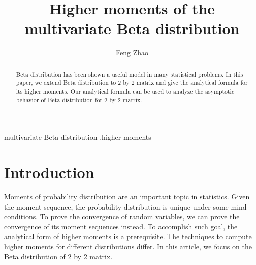\documentclass{elsarticle}
\begin{document}
\begin{frontmatter}
\title{Higher moments of the multivariate Beta distribution}
\author{Feng Zhao}


 \begin{abstract}
Beta distribution has been shown a useful model in many statistical problems.
In this paper, we extend Beta distribution to 2 by 2 matrix and
give the analytical
formula for its higher moments. Our analytical formula can be used to analyze the asymptotic behavior of Beta distribution
for 2 by 2 matrix.
 \end{abstract}

\begin{keyword}
	multivariate Beta distribution \sep higher moments
\end{keyword}
\end{frontmatter}
\section{Introduction}
Moments of probability distribution are an important topic in statistics. Given the moment sequence,
the probability distribution is unique under some mind conditions.
To prove the convergence of random variables,  we can prove the convergence of its moment sequences instead.
To accomplish such goal, the analytical form of higher moments is a prerequisite. The techniques to compute higher moments
for different distributions differ. In this article, we focus
on the Beta distribution of 2 by 2 matrix.
\end{document}
